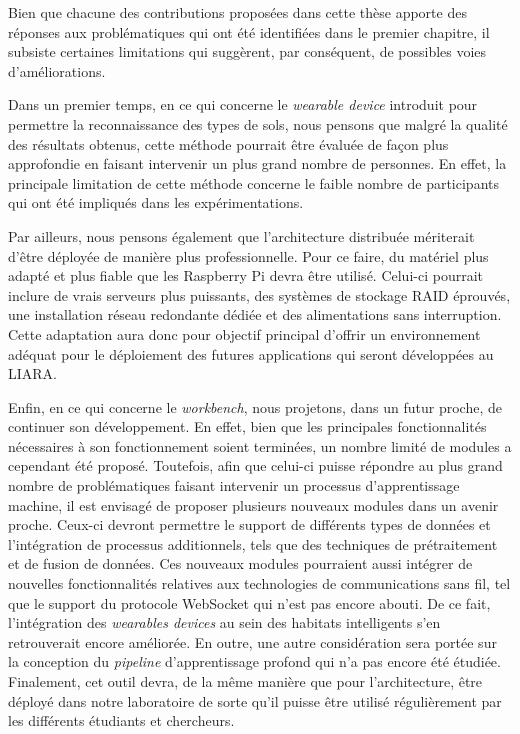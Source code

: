 Bien que chacune des contributions proposées dans cette thèse apporte des réponses aux problématiques qui ont été identifiées dans le premier chapitre, il subsiste certaines limitations qui suggèrent, par conséquent, de possibles voies d'améliorations.

Dans un premier temps, en ce qui concerne le \textit{wearable device} introduit pour permettre la reconnaissance des types de sols, nous pensons que malgré la qualité des résultats obtenus, cette méthode pourrait être évaluée de façon plus approfondie en faisant intervenir un plus grand nombre de personnes. En effet, la principale limitation de cette méthode concerne le faible nombre de participants qui ont été impliqués dans les expérimentations.

Par ailleurs, nous pensons également que l'architecture distribuée mériterait d'être déployée de manière plus professionnelle. Pour ce faire, du matériel plus adapté et plus fiable que les Raspberry Pi devra être utilisé. Celui-ci pourrait inclure de vrais serveurs plus puissants, des systèmes de stockage \acs{RAID} éprouvés, une installation réseau redondante dédiée et des alimentations sans interruption. Cette adaptation aura donc pour objectif principal d'offrir un environnement adéquat pour le déploiement des futures applications qui seront développées au \acs{LIARA}.

Enfin, en ce qui concerne le \textit{workbench}, nous projetons, dans un futur proche, de continuer son développement. En effet, bien que les principales fonctionnalités nécessaires à son fonctionnement soient terminées, un nombre limité de modules a cependant été proposé. Toutefois, afin que celui-ci puisse répondre au plus grand nombre de problématiques faisant intervenir un processus d'apprentissage machine, il est envisagé de proposer plusieurs nouveaux modules dans un avenir proche. Ceux-ci devront permettre le support de différents types de données et l'intégration de processus additionnels, tels que des techniques de prétraitement et de fusion de données. Ces nouveaux modules pourraient aussi intégrer de nouvelles fonctionnalités relatives aux technologies de communications sans fil, tel que le support du protocole WebSocket qui n'est pas encore abouti. De ce fait, l'intégration des \textit{wearables devices} au sein des habitats intelligents s'en retrouverait encore améliorée. En outre, une autre considération sera portée sur la conception du \textit{pipeline} d'apprentissage profond qui n'a pas encore été étudiée. Finalement, cet outil devra, de la même manière que pour l'architecture, être déployé dans notre laboratoire de sorte qu'il puisse être utilisé régulièrement par les différents étudiants et chercheurs.

